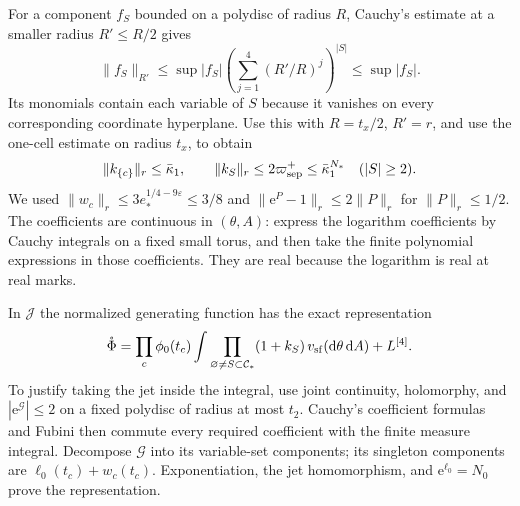 For a component $f_S$ bounded on a polydisc
of radius $R$, Cauchy's estimate at a smaller
radius $R'\le R/2$ gives
\[
 \|f_S\|_{R'}\le\sup|f_S|
             \left(\sum_{j=1}^4(R'/R)^j\right)^{|S|}
                         \le\sup|f_S|.
\]
Its monomials contain each variable of $S$
because it vanishes on every corresponding
coordinate hyperplane. Use this with
$R=t_x/2$, $R'=r$, and use the one-cell
estimate on radius $t_x$, to obtain
\begin{equation}\label{eq:interacting-error-jets}
 \|k_{\{c\}}\|_r\le\bar\kappa_1,\qquad
 \|k_S\|_r\le2\varpi_{\rm sep}^+
                       \le\bar\kappa_1^{N_*}\quad(|S|\ge2).
\end{equation}
We used $\|w_c\|_r\le3e_*^{1/4-9\varepsilon}\le3/8$
and $\|\mathrm e^P-1\|_r\le2\|P\|_r$ for $\|P\|_r\le1/2$.
The coefficients are continuous in $(\theta,A)$:
express the logarithm coefficients by Cauchy
integrals on a fixed small torus, and then
take the finite polynomial expressions in
those coefficients. They are real because
the logarithm is real at real marks.

In $\mathcal J$ the normalized generating
function has the exact representation
\begin{equation}\label{eq:interacting-jet-representation}
 \mathring\Phi=
   \prod_c\phi_0(t_c)
       \int\prod_{\varnothing\ne S\subset\mathcal C_*}
                         (1+k_S)\,v_{\rm sf}(\mathrm d\theta\,\mathrm d A)
       +L^{[4]}.
\end{equation}
To justify taking the jet inside the integral,
use joint continuity, holomorphy, and
$|\mathrm e^{\mathcal G}|\le2$ on a fixed
polydisc of radius at most $t_2$.
Cauchy's coefficient formulas and Fubini
then commute every required coefficient
with the finite measure integral.
Decompose $\mathcal G$ into its variable-set
components; its singleton components are
$\ell_0(t_c)+w_c(t_c)$.
Exponentiation, the jet homomorphism,
and $\mathrm e^{\ell_0}=N_0$ prove the representation.

